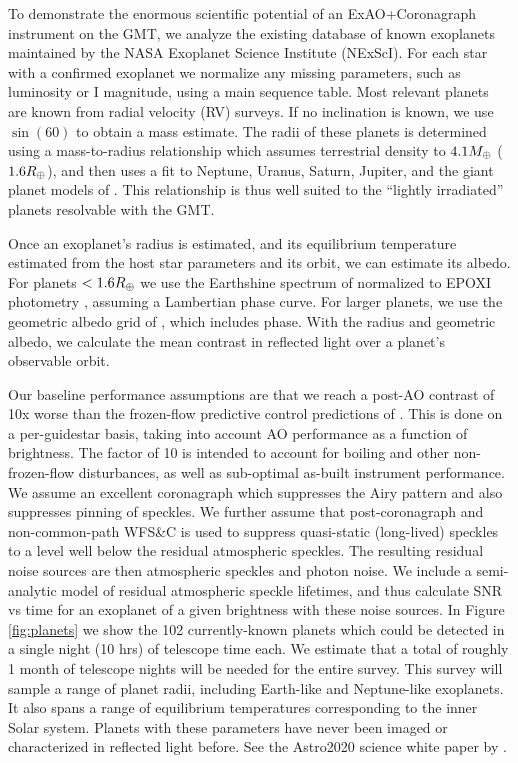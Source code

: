 \documentclass[12pt,preprint]{aastex}
\begin{document}
To demonstrate the enormous scientific potential of an ExAO+Coronagraph instrument on the GMT, we analyze the existing database of known exoplanets maintained by the NASA Exoplanet Science Institute (NExScI).  For each star with a confirmed exoplanet we normalize any missing parameters, such as luminosity or I magnitude, using a main sequence table.  Most relevant planets are known from radial velocity (RV) surveys.  If no inclination is known, we use $\sin(60)$ to obtain a mass estimate.  The radii of these planets is determined using a mass-to-radius relationship which assumes terrestrial density to $4.1 M_\oplus$ ($1.6 R_\oplus$), and then uses a fit to Neptune, Uranus, Saturn, Jupiter, and the giant planet models of \citet{2007ApJ...659.1661F}.  This relationship is thus well suited to the “lightly irradiated” planets resolvable with the GMT.

Once an exoplanet’s radius is estimated, and its equilibrium temperature estimated from the host star parameters and its orbit, we can estimate its albedo.  For planets $< 1.6 R_\oplus$ we use the Earthshine spectrum of \citet{2006ApJ...644..551T} normalized to EPOXI photometry \citep{2013ApJ...765L..17C}, assuming a Lambertian phase curve. For larger planets, we use the geometric albedo grid of \citet{2010ApJ...724..189C}, which includes phase.  With the radius and geometric albedo, we calculate the mean contrast in reflected light over a planet’s observable orbit.	

Our baseline performance assumptions are that we reach a post-AO contrast of 10x worse than the frozen-flow predictive control predictions of \citet{2018JATIS...4a9001M}.  This is done on a per-guidestar basis, taking into account AO performance as a function of brightness.  The factor of 10 is intended to account for boiling and other non-frozen-flow disturbances, as well as sub-optimal as-built instrument performance. We assume an excellent coronagraph which suppresses the Airy pattern and also suppresses pinning of speckles.   We further assume that post-coronagraph and non-common-path WFS\&C is used to suppress quasi-static (long-lived) speckles to a level well below the residual atmospheric speckles.  The resulting residual noise sources are then atmospheric speckles and photon noise.  We include a semi-analytic model of residual atmospheric speckle lifetimes, and thus calculate SNR vs time for an exoplanet of a given brightness with these noise sources.
In Figure \ref{fig:planets} we show the 102 currently-known planets which could be detected in a single night (10 hrs) of telescope time each.  We estimate that a total of roughly 1 month of telescope nights will be needed for the entire survey.  This survey will sample a range of planet radii, including Earth-like and Neptune-like exoplanets.  It also spans a range of equilibrium temperatures corresponding to the inner Solar system.  Planets with these parameters have never been imaged or characterized in reflected light before.  See the Astro2020 science white paper by \citet{2019BAAS...51c.345M}.
\end{document}

